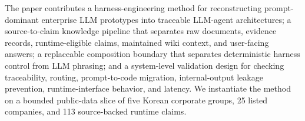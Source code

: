 The paper contributes a harness-engineering method for reconstructing prompt-dominant enterprise LLM prototypes into traceable LLM-agent architectures; a source-to-claim knowledge pipeline that separates raw documents, evidence records, runtime-eligible claims, maintained wiki context, and user-facing answers; a replaceable composition boundary that separates deterministic harness control from LLM phrasing; and a system-level validation design for checking traceability, routing, prompt-to-code migration, internal-output leakage prevention, runtime-interface behavior, and latency. We instantiate the method on a bounded public-data slice of five Korean corporate groups, 25 listed companies, and 113 source-backed runtime claims.
